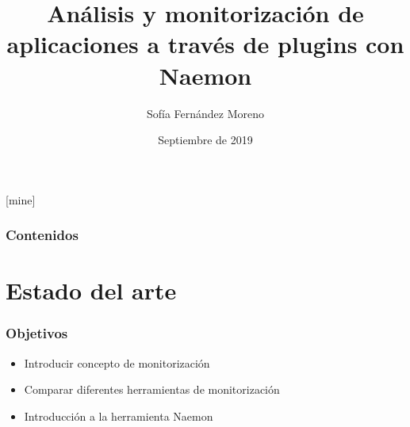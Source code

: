 \documentclass{beamer}
\title[]{Análisis y monitorización de aplicaciones a través de plugins con Naemon} %
\author{Sofía Fernández Moreno} %
\institute[UGR] %
{
  Universidad de Granada \\ %
}
\date{Septiembre de 2019} %
\theoremstyle{plain}
\theoremstyle{definition}
\theoremstyle{plain}
\theoremstyle{definition}
\theoremstyle{remark}
\theoremstyle{definition}
\begin{document}
\theoremstyle{definition}
[mine]

\frame{\titlepage}

\begin{frame}
  \frametitle{Contenidos} %
  \tableofcontents
\end{frame}



\section{Estado del arte} %
\begin{frame}
	
	\frametitle{Objetivos}
	\begin{itemize}
		\item Introducir concepto de monitorización
		\item Comparar diferentes herramientas de monitorización
		\item Introducción a la herramienta Naemon
	\end{itemize}
	
\end{frame}
\end{document}
